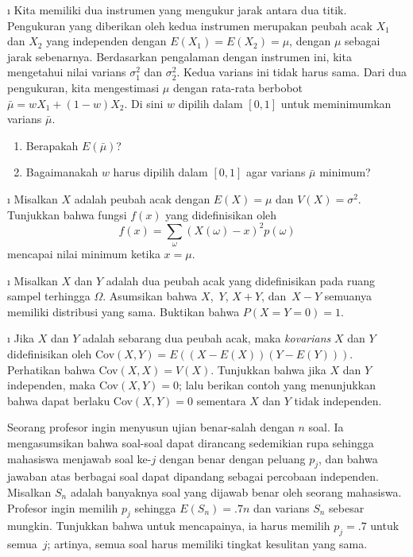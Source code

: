 \begin{LJSItem}
\i\label{exer 6.2.21} Kita memiliki dua instrumen yang mengukur jarak antara dua
titik.  Pengukuran yang diberikan oleh kedua instrumen merupakan peubah acak $X_1$
dan $X_2$ yang independen dengan $E(X_1) = E(X_2) = \mu$, dengan $\mu$ sebagai jarak
sebenarnya.  Berdasarkan pengalaman dengan instrumen ini, kita mengetahui nilai
varians $\sigma_1^2$ dan $\sigma_2^2$.  Kedua varians ini tidak harus sama.  Dari dua
pengukuran, kita mengestimasi $\mu$ dengan rata-rata berbobot $\bar \mu = wX_1 +
(1 - w)X_2$.  Di sini $w$ dipilih dalam $[0,1]$ untuk meminimumkan varians $\bar \mu$.
\begin{enumerate}
\item Berapakah $E(\bar \mu)$?

\item Bagaimanakah $w$ harus dipilih dalam $[0,1]$ agar varians $\bar \mu$ minimum?
\end{enumerate}

\i\label{exer 6.2.22} Misalkan $X$ adalah peubah acak dengan $E(X) = \mu$ dan
$V(X) = \sigma^2$.  Tunjukkan bahwa fungsi $f(x)$ yang didefinisikan oleh
$$ f(x) = \sum_\omega (X(\omega) - x)^2 p(\omega)
$$ mencapai nilai minimum ketika $x = \mu$.

\i\label{exer 6.2.23} Misalkan $X$ dan $Y$ adalah dua peubah acak yang didefinisikan
pada ruang sampel terhingga $\Omega$.  Asumsikan bahwa $X$,~$Y$, $X + Y$, dan~$X - Y$
semuanya memiliki distribusi yang sama.  Buktikan bahwa $P(X = Y = 0) = 1$.

\i\label{exer 6.2.24} Jika $X$ dan $Y$ adalah sebarang dua peubah acak, maka {\em
kovarians} $X$ dan $Y$ didefinisikan oleh {\rm Cov}$(X,Y) = E((X - E(X))(Y -
E(Y)))$.  Perhatikan bahwa {\rm Cov}$(X,X) = V(X)$.  Tunjukkan bahwa jika $X$ dan $Y$
independen, maka {\rm Cov}$(X,Y) = 0$; lalu berikan contoh yang menunjukkan bahwa
dapat berlaku {\rm Cov}$(X,Y) = 0$ sementara $X$ dan $Y$ tidak independen.

\istar\label{exer 6.2.25} Seorang profesor ingin menyusun ujian benar-salah
 dengan $n$ soal.  Ia mengasumsikan bahwa soal-soal dapat
dirancang sedemikian rupa sehingga mahasiswa menjawab soal ke-$j$ dengan benar dengan
peluang $p_j$, dan bahwa jawaban atas berbagai soal dapat dipandang sebagai percobaan
independen.  Misalkan $S_n$ adalah banyaknya soal yang dijawab benar oleh seorang
mahasiswa.  Profesor ingin memilih $p_j$ sehingga $E(S_n) = .7n$ dan varians $S_n$
sebesar mungkin.  Tunjukkan bahwa untuk mencapainya, ia harus memilih $p_j = .7$
untuk semua~$j$; artinya, semua soal harus memiliki tingkat kesulitan yang sama.


\end{LJSItem}
